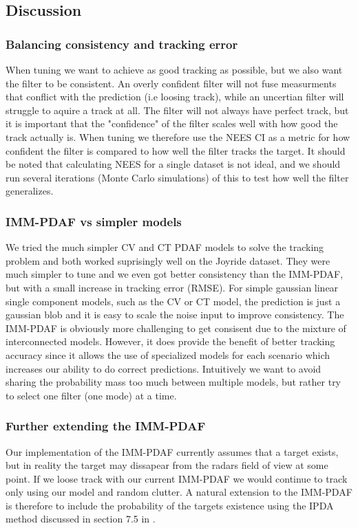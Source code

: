 \subsection{Discussion}
\subsubsection{Balancing consistency and tracking error}
When tuning we want to achieve as good tracking as possible, but we also want the filter to be consistent. An overly confident filter will not fuse measurments that conflict with the prediction (i.e loosing track), while an uncertian filter will struggle to aquire a track at all. The filter will not always have perfect track, but it is important that the "confidence" of the filter scales well with how good the track actually is.
When tuning we therefore use the NEES CI as a metric for how confident the filter is compared to how well the filter tracks the target. It should be noted that calculating NEES for a single dataset is not ideal, and we should run several iterations (Monte Carlo simulations) of this to test how well the filter generalizes.

\subsubsection{IMM-PDAF vs simpler models} \label{whyimmpdaf}
We tried the much simpler CV and CT PDAF models to solve the tracking problem and both worked suprisingly well on the Joyride dataset. They were much simpler to tune and we even got better consistency than the IMM-PDAF, but with a small increase in tracking error (RMSE). For simple gaussian linear single component models, such as the CV or CT model, the prediction is just a gaussian blob and it is easy to scale the noise input to improve consistency. The IMM-PDAF is obviously more challenging to get consisent due to the mixture of interconnected models. However, it does provide the benefit of better tracking accuracy since it allows the use of specialized models for each scenario which increases our ability to do correct predictions. Intuitively we want to avoid sharing the probability mass too much between multiple models, but rather try to select one filter (one mode) at a time.

\subsubsection{Further extending the IMM-PDAF}
Our implementation of the IMM-PDAF currently assumes that a target exists, but in reality the target may dissapear from the radars field of view at some point. If we loose track with our current IMM-PDAF we would continue to track only using our model and random clutter. A natural extension to the IMM-PDAF is therefore to include the probability of the targets existence using the IPDA method discussed in section 7.5 in \cite{edmund}. 
